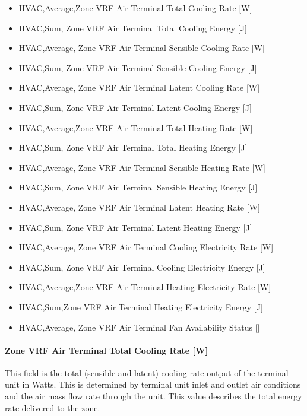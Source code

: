 \begin{itemize}
\item
  HVAC,Average,Zone VRF Air Terminal Total Cooling Rate {[}W{]}
\item
  HVAC,Sum, Zone VRF Air Terminal Total Cooling Energy {[}J{]}
\item
  HVAC,Average, Zone VRF Air Terminal Sensible Cooling Rate {[}W{]}
\item
  HVAC,Sum, Zone VRF Air Terminal Sensible Cooling Energy {[}J{]}
\item
  HVAC,Average, Zone VRF Air Terminal Latent Cooling Rate {[}W{]}
\item
  HVAC,Sum, Zone VRF Air Terminal Latent Cooling Energy {[}J{]}
\item
  HVAC,Average,Zone VRF Air Terminal Total Heating Rate {[}W{]}
\item
  HVAC,Sum, Zone VRF Air Terminal Total Heating Energy {[}J{]}
\item
  HVAC,Average, Zone VRF Air Terminal Sensible Heating Rate {[}W{]}
\item
  HVAC,Sum, Zone VRF Air Terminal Sensible Heating Energy {[}J{]}
\item
  HVAC,Average, Zone VRF Air Terminal Latent Heating Rate {[}W{]}
\item
  HVAC,Sum, Zone VRF Air Terminal Latent Heating Energy {[}J{]}
\item
  HVAC,Average, Zone VRF Air Terminal Cooling Electricity Rate {[}W{]}
\item
  HVAC,Sum, Zone VRF Air Terminal Cooling Electricity Energy {[}J{]}
\item
  HVAC,Average,Zone VRF Air Terminal Heating Electricity Rate {[}W{]}
\item
  HVAC,Sum,Zone VRF Air Terminal Heating Electricity Energy {[}J{]}
\item
  HVAC,Average, Zone VRF Air Terminal Fan Availability Status {[]}
\end{itemize}

\paragraph{Zone VRF Air Terminal Total Cooling Rate {[}W{]}}\label{zone-vrf-air-terminal-total-cooling-rate-w}

This field is the total (sensible and latent) cooling rate output of the terminal unit in Watts. This is determined by terminal unit inlet and outlet air conditions and the air mass flow rate through the unit. This value describes the total energy rate delivered to the zone.

